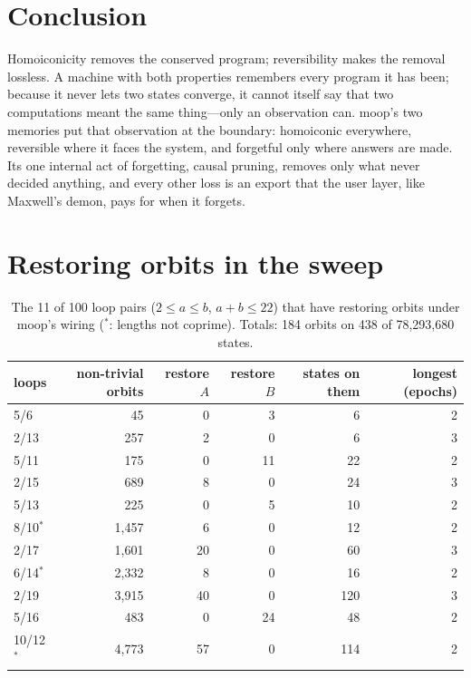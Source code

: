 \documentclass[11pt]{article}
\theoremstyle{definition}
\theoremstyle{remark}
\newcommand{\moop}{\textsf{moop}}
\begin{document}
\section{Conclusion}
\label{sec:conclusion}

Homoiconicity removes the conserved program; reversibility makes the
removal lossless. A machine with both properties remembers every
program it has been; because it never lets two states converge, it
cannot itself say that two computations meant the same thing---only an
observation can. \moop{}'s two memories put that observation at the
boundary: homoiconic everywhere, reversible where it faces the system,
and forgetful only where answers are made. Its one internal
act of forgetting, causal pruning, removes only what never decided
anything, and every other loss is an export that the user layer, like
Maxwell's demon, pays for when it forgets.




\appendix

\section{Restoring orbits in the sweep}
\label{app:sweep}

\begin{table}[h]
\centering
\small
\begin{tabular}{@{}l r r r r r@{}}
\toprule
loops & non-trivial orbits & restore $A$ & restore $B$ & states on them
  & longest (epochs) \\
\midrule
5/6        &    45 &  0 &  3 &   6 & 2 \\
2/13       &   257 &  2 &  0 &   6 & 3 \\
5/11       &   175 &  0 & 11 &  22 & 2 \\
2/15       &   689 &  8 &  0 &  24 & 3 \\
5/13       &   225 &  0 &  5 &  10 & 2 \\
8/10$^*$   & 1,457 &  6 &  0 &  12 & 2 \\
2/17       & 1,601 & 20 &  0 &  60 & 3 \\
6/14$^*$   & 2,332 &  8 &  0 &  16 & 2 \\
2/19       & 3,915 & 40 &  0 & 120 & 3 \\
5/16       &   483 &  0 & 24 &  48 & 2 \\
10/12$^*$  & 4,773 & 57 &  0 & 114 & 2 \\
\bottomrule
\end{tabular}
\caption{The 11 of 100 loop pairs ($2\le a\le b$, $a+b\le22$) that have
restoring orbits under \moop{}'s wiring ($^*$: lengths not coprime).
Totals: 184 orbits on 438 of 78,293,680 states.}
\label{tab:restoring}
\end{table}
\end{document}
